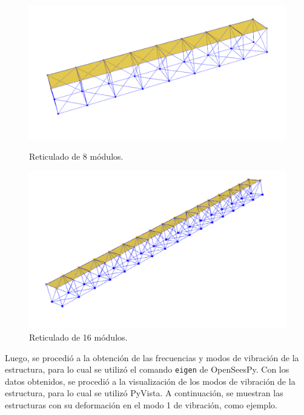 \begin{figure}[H]
    \begin{minipage}[b]{0.5\textwidth}
        \centering
        \includegraphics[width=\textwidth]{FOTOS/8.png}
        \caption{Reticulado de 8 módulos.}
    \end{minipage}
    \hfill
    \begin{minipage}[b]{0.5\textwidth}
        \centering
        \includegraphics[width=\textwidth]{FOTOS/16.png}
        \caption{Reticulado de 16 módulos.}
    \end{minipage}
\end{figure}

Luego, se procedió a la obtención de las frecuencias y modos de vibración de la estructura, para lo cual se utilizó el comando \texttt{eigen} de OpenSeesPy. Con los datos obtenidos, se procedió a la visualización de los modos de vibración de la estructura, para lo cual se utilizó PyVista. A continuación, se muestran las estructuras con su deformación en el modo 1 de vibración, como ejemplo.

